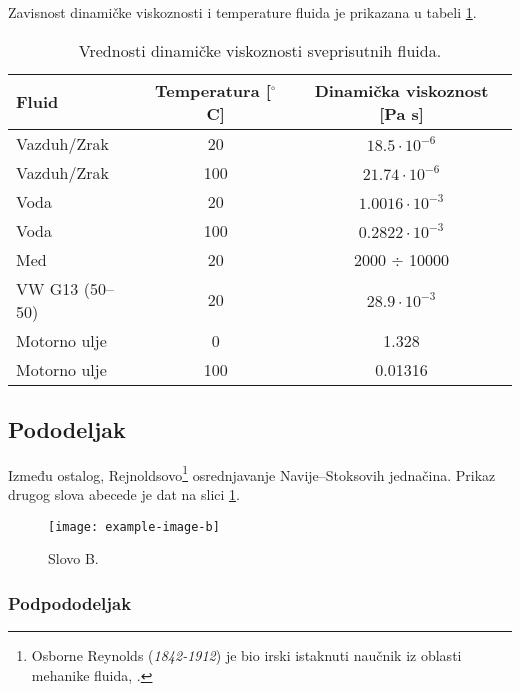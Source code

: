\documentclass[12pt,serbian]{article} %
\numberwithin{figure}{section}
\numberwithin{table}{section}
\begin{document}
Zavisnost dinamičke viskoznosti i temperature fluida je prikazana u tabeli \ref{tab:din_vis}.
\begin{table}[H]
\small
\centering
\begin{tabular}{@{}lcc@{}}
\textbf{Fluid} & \textbf{Temperatura} [$^{\circ}$C] & \textbf{Dinamička viskoznost} [Pa s] \\
\bottomrule
Vazduh/Zrak  & 20  & $18.5 \cdot 10^{-6}$   \\

Vazduh/Zrak  & 100  & $21.74 \cdot 10^{-6}$   \\

Voda & 20 & $1.0016 \cdot 10^{-3}$\\

Voda & 100 &  $0.2822 \cdot 10^{-3}$\\

Med & 20 & 2000 $\div$ 10000\\

VW G13 (50--50) & 20  & $28.9 \cdot 10^{-3}$\\

Motorno ulje & 0 & 1.328\\

Motorno ulje & 100 & 0.01316\\
\bottomrule
\end{tabular}
\caption{Vrednosti dinamičke viskoznosti sveprisutnih fluida.}
\label{tab:din_vis}
\end{table}


\subsection{Pododeljak}
Između ostalog, Rejnoldsovo\footnote{Osborne Reynolds  (\textit{{1842-1912}}) je bio irski istaknuti naučnik iz oblasti mehanike fluida, \cite{MehFlu}.} osrednjavanje Navije--Stoksovih jednačina. Prikaz drugog slova abecede je dat na slici \ref{fig:slovo_B}.


\begin{figure}[H]
    \centering
    \texttt{[image: example-image-b]}
    \caption{Slovo B.}
    \label{fig:slovo_B}
\end{figure}



\subsubsection{Podpododeljak}
\end{document}

